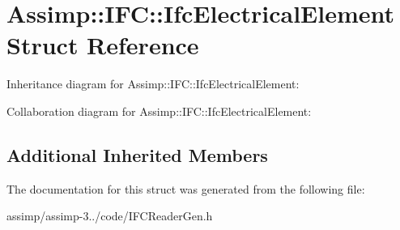 \hypertarget{struct_assimp_1_1_i_f_c_1_1_ifc_electrical_element}{\section{Assimp\+:\+:I\+F\+C\+:\+:Ifc\+Electrical\+Element Struct Reference}
\label{struct_assimp_1_1_i_f_c_1_1_ifc_electrical_element}
}


Inheritance diagram for Assimp\+:\+:I\+F\+C\+:\+:Ifc\+Electrical\+Element\+:


Collaboration diagram for Assimp\+:\+:I\+F\+C\+:\+:Ifc\+Electrical\+Element\+:
\subsection*{Additional Inherited Members}


The documentation for this struct was generated from the following file\+:\begin{DoxyCompactItemize}
\item 
assimp/assimp-\/3../code/I\+F\+C\+Reader\+Gen.\+h\end{DoxyCompactItemize}
